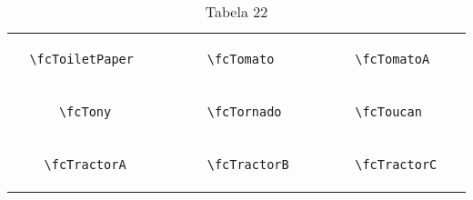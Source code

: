 \documentclass[x11names]{article}
\begin{document}
\begin{table}[H]
\begin{tabular}{|c|c|c|c|c|c|}
		&\multirow{5}{*}{	\fcToiletPaper	[scale=0.4]} & &\multirow{5}{*}{	\fcTomato	[scale=0.4]} & &\multirow{5}{*}{	\fcTomatoA	[scale=0.4]}\\	& & & & & \\	& & & & & \\	\verb|	\fcToiletPaper	| & & \verb|	\fcTomato	| & & \verb|	\fcTomatoA	| & \\	& & & & & \\	& & & & & \\	& & & & & \\	\hline									
		&\multirow{5}{*}{	\fcTony	[scale=0.4]} & &\multirow{5}{*}{	\fcTornado	[scale=0.4]} & &\multirow{5}{*}{	\fcToucan	[scale=0.4]}\\	& & & & & \\	& & & & & \\	\verb|	\fcTony	| & & \verb|	\fcTornado	| & & \verb|	\fcToucan	| & \\	& & & & & \\	& & & & & \\	& & & & & \\	\hline									
		&\multirow{5}{*}{	\fcTractorA	[scale=0.4]} & &\multirow{5}{*}{	\fcTractorB	[scale=0.8]} & &\multirow{5}{*}{	\fcTractorC	[scale=0.4]}\\	& & & & & \\	& & & & & \\	\verb|	\fcTractorA	| & & \verb|	\fcTractorB	| & & \verb|	\fcTractorC	| & \\	& & & & & \\	& & & & & \\	& & & & & \\		\hline 	\hline 	\end{tabular}	\caption{	Tabela 22	}\label{	Tab22	}\end{table}
\end{document}

